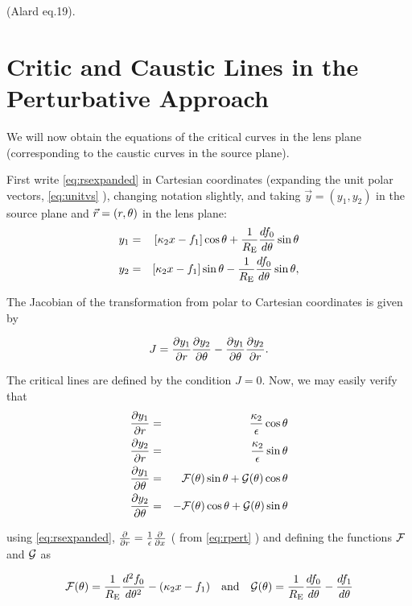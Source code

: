 (Alard eq.19).

\section{Critic and Caustic Lines in the Perturbative Approach}

We will now obtain the equations of the critical curves in the lens
plane (corresponding to the caustic curves in the source plane).

First write \eqref{eq:rsexpanded} in Cartesian coordinates (expanding
the unit polar vectors, \eqref{eq:unitvs} ), changing notation
slightly, and taking $\vec{y}=(y_1,y_2)$ in the source plane and
$\vec{r}=(r,\theta)$ in the lens plane:
\begin{eqnarray}
y_{1} &=& [\kappa_2 x - f_1]\cos{\theta}+\frac{1}{R_{\mathrm{E}}}\frac{d f_0}{d\theta}\sin{\theta} \label{y_1}\\
y_{2} &=& [\kappa_2 x - f_1]\sin{\theta}-\frac{1}{R_{\mathrm{E}}}\frac{d f_0}{d\theta}\sin{\theta} \label{y_2},
\end{eqnarray}

The Jacobian of the transformation from polar to Cartesian coordinates is given by

\begin{equation}
J=\frac{\partial y_1}{\partial r}\frac{\partial y_2}{\partial \theta}-\frac{\partial y_1}{\partial \theta}\frac{\partial y_2}{\partial r}.
\label{jacob}
\end{equation}

The critical lines are defined by the condition $J=0$. Now, we may easily verify that
\begin{eqnarray}
\frac{\partial y_1}{\partial r}&=& \frac{\kappa_2}{\epsilon} \cos{\theta}\label{dy1dx}   \\
\frac{\partial y_2}{\partial r}&=& \frac{\kappa_2}{\epsilon} \sin{\theta}\\
\frac{\partial y_1}{\partial \theta}&=& \mathcal{F}(\theta)\sin{\theta}+\mathcal{G}(\theta)\cos{\theta}\\
\frac{\partial y_2}{\partial \theta}&=& -\mathcal{F}(\theta)\cos{\theta}+\mathcal{G}(\theta)\sin{\theta}\label{dy2dte}
\end{eqnarray}

using \eqref{eq:rsexpanded}, ${\partial \over \partial r} ={ 1 \over \epsilon}
{\partial \over \partial x}$ ( from \eqref{eq:rpert} ) and defining the functions
$\mathcal{F}$ and $\mathcal{G}$ as

\begin{equation}
\scriptf(\te)=\frac{1}{\re}\frac{d^2f_0}{d\te^2}-(\kt x -f_1) \quad \textrm{and} \quad %
\scriptg(\te)=\frac{1}{\re}\frac{df_0}{d\te}-\frac{df_1}{d\te}
\end{equation}

